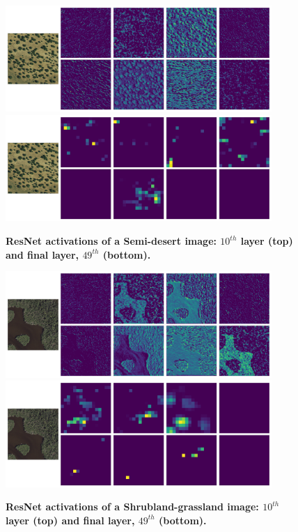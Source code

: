 \begin{figure}[H]
	\centering
	\includegraphics[width=0.9\textwidth]{Figures/activations/semi-desert_l0_s1_activation_10.png}
	\includegraphics[width=0.9\textwidth]{Figures/activations/semi-desert_l0_s1_activation_49.png}
	\captionsetup{width=1\linewidth}
	\caption{\textbf{ResNet activations of a Semi-desert image: $10^{th}$ layer (top) and final layer, $49^{th}$ (bottom).}}
	\label{fig:act_semi_desert}
\end{figure}

\begin{figure}[H]
	\centering
	\includegraphics[width=0.9\textwidth]{Figures/activations/shrubland-grassland_l0_s1_activation_10.png}
	\includegraphics[width=0.9\textwidth]{Figures/activations/shrubland-grassland_l0_s1_activation_49.png}
	\captionsetup{width=1\linewidth}
	\caption{\textbf{ResNet activations of a Shrubland-grassland image: $10^{th}$ layer (top) and final layer, $49^{th}$ (bottom).}}
	\label{fig:act_shrubland_grassland}
\end{figure}



